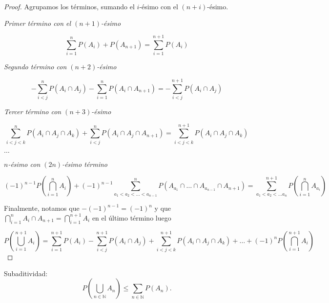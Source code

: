 \documentclass[
  a4paper,
  spanish,
  12pt,
]{scrartcl}
\begin{document}
\begin{proof}
Agrupamos los términos, sumando el $i$-ésimo con el $(n+i)$-ésimo.

\emph{Primer término con el $(n+1)$-ésimo}

$$ \sum_{i=1}^n P(A_i) + P(A_{n+1}) = \sum_{i=1}^{n+1} P(A_i) $$

\emph{Segundo término con $(n+2)$-ésimo}

$$-\sum_{i < j}^n P(A_i \cap A_j) - \sum_{i=1}^n P(A_i \cap A_{n+1}) = -\sum_{i < j}^{n+1} P(A_i \cap A_j)$$

\emph{Tercer término con $(n+3)$-ésimo}

$$\sum_{i < j < k}^n P(A_i \cap A_j \cap A_k) + \sum_{i < j}^n P(A_i \cap A_j \cap A_{n+1}) = \sum_{i < j < k} ^{n+1} P(A_i \cap A_j \cap A_k)$$

$\dots$

\emph{$n$-ésimo con $(2n)$-ésimo término}

$$
(-1)^{n-1}P\left(\bigcap_{i=1}^n A_i \right) + (-1)^{n-1}\sum_{a_1 < a_2 < ... < a_{n - 1}}^n P\left(A_{a_1} \cap \dots \cap  A_{a_{n-1}} \cap A_{n+1}\right) = \sum_{a_1 < a_2 < \dots a_n}^{n+1} P\left(\bigcap_{i=1}^n A_{a_i}\right)
$$


Finalmente, notamos que $-(-1)^{n-1} = (-1)^n$ y que $\bigcap_{i=1}^n A_i \cap A_{n+1} = \bigcap_{i=1}^{n+1} A_i$ en el último término luego

$$
P\left(\bigcup_{i=1}^{n+1} A_i \right) = \sum_{i=1}^{n+1} P(A_i) - \sum_{i < j}^{n+1} P(A_i \cap A_j) + \sum_{i < j < k}^{n+1} P(A_i \cap A_j \cap A_k) + \dots  + (-1)^nP\left(\bigcap_{i=1}^{n+1} A_i \right)
$$

\end{proof}

\begin{nprop}
     Subaditividad: 
$$
P\left(\bigcup_{n \in \mathbb{N}} A_n\right) \leq \sum_{n \in \mathbb{N}} P(A_n).
$$
\end{nprop}
\end{document}
